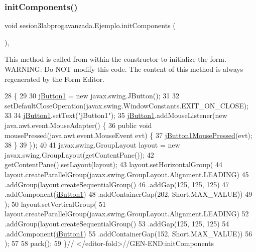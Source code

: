 \subsubsection{\texorpdfstring{init\+Components()}{initComponents()}}
{\footnotesize\ttfamily void sesion3labprogavanzada.\+Ejemplo.\+init\+Components (\begin{DoxyParamCaption}{ }\end{DoxyParamCaption})\hspace{0.3cm}{\ttfamily [inline]}, {\ttfamily [private]}}

This method is called from within the constructor to initialize the form. W\+A\+R\+N\+I\+NG\+: Do N\+OT modify this code. The content of this method is always regenerated by the Form Editor. 
\begin{DoxyCode}
28                                   \{
29 
30         \mbox{\hyperlink{classsesion3labprogavanzada_1_1_ejemplo_a6a4f016ed7635a1b0293cbac72ee8933}{jButton1}} = \textcolor{keyword}{new} javax.swing.JButton();
31 
32         setDefaultCloseOperation(javax.swing.WindowConstants.EXIT\_ON\_CLOSE);
33 
34         \mbox{\hyperlink{classsesion3labprogavanzada_1_1_ejemplo_a6a4f016ed7635a1b0293cbac72ee8933}{jButton1}}.setText(\textcolor{stringliteral}{"jButton1"});
35         \mbox{\hyperlink{classsesion3labprogavanzada_1_1_ejemplo_a6a4f016ed7635a1b0293cbac72ee8933}{jButton1}}.addMouseListener(\textcolor{keyword}{new} java.awt.event.MouseAdapter() \{
36             \textcolor{keyword}{public} \textcolor{keywordtype}{void} mousePressed(java.awt.event.MouseEvent evt) \{
37                 \mbox{\hyperlink{classsesion3labprogavanzada_1_1_ejemplo_a2718c3cd0a04e4a09a5bb6a2252807ad}{jButton1MousePressed}}(evt);
38             \}
39         \});
40 
41         javax.swing.GroupLayout layout = \textcolor{keyword}{new} javax.swing.GroupLayout(getContentPane());
42         getContentPane().setLayout(layout);
43         layout.setHorizontalGroup(
44             layout.createParallelGroup(javax.swing.GroupLayout.Alignment.LEADING)
45             .addGroup(layout.createSequentialGroup()
46                 .addGap(125, 125, 125)
47                 .addComponent(\mbox{\hyperlink{classsesion3labprogavanzada_1_1_ejemplo_a6a4f016ed7635a1b0293cbac72ee8933}{jButton1}})
48                 .addContainerGap(202, Short.MAX\_VALUE))
49         );
50         layout.setVerticalGroup(
51             layout.createParallelGroup(javax.swing.GroupLayout.Alignment.LEADING)
52             .addGroup(layout.createSequentialGroup()
53                 .addGap(125, 125, 125)
54                 .addComponent(\mbox{\hyperlink{classsesion3labprogavanzada_1_1_ejemplo_a6a4f016ed7635a1b0293cbac72ee8933}{jButton1}})
55                 .addContainerGap(152, Short.MAX\_VALUE))
56         );
57 
58         pack();
59     \}\textcolor{comment}{// </editor-fold>//GEN-END:initComponents}
\end{DoxyCode}

